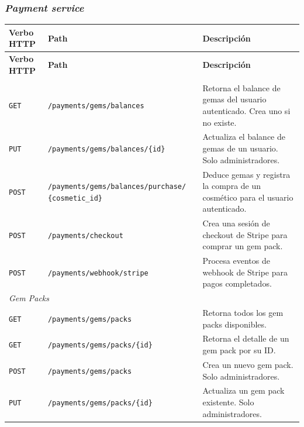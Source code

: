 \subsubsection{\textit{Payment service}}

\renewcommand{\arraystretch}{1.4}
\begin{longtable}{|p{2cm}|p{7cm}|p{5.5cm}|}
\hline
\textbf{Verbo HTTP} & \textbf{Path} & \textbf{Descripción} \\
\hline
\endfirsthead

\hline
\textbf{Verbo HTTP} & \textbf{Path} & \textbf{Descripción} \\
\hline
\endhead

\endfoot

\multicolumn{3}{|l|}{\textit{Gem Balances}} \\
\hline
\texttt{GET}    & \texttt{/payments/gems/balances}                              & Retorna el balance de gemas del usuario autenticado. Crea uno si no existe. \\
\hline
\texttt{PUT}    & \texttt{/payments/gems/balances/\{id\}}                       & Actualiza el balance de gemas de un usuario. Solo administradores. \\
\hline
\texttt{POST}   & \texttt{/payments/gems/balances/purchase/} \newline \texttt{\{cosmetic\_id\}} & Deduce gemas y registra la compra de un cosmético para el usuario autenticado. \\
\hline
\texttt{POST}   & \texttt{/payments/checkout}                                   & Crea una sesión de checkout de Stripe para comprar un gem pack. \\
\hline
\texttt{POST}   & \texttt{/payments/webhook/stripe}                             & Procesa eventos de webhook de Stripe para pagos completados. \\
\hline
\multicolumn{3}{|l|}{\textit{Gem Packs}} \\
\hline
\texttt{GET}    & \texttt{/payments/gems/packs}                                 & Retorna todos los gem packs disponibles. \\
\hline
\texttt{GET}    & \texttt{/payments/gems/packs/\{id\}}                          & Retorna el detalle de un gem pack por su ID. \\
\hline
\texttt{POST}   & \texttt{/payments/gems/packs}                                 & Crea un nuevo gem pack. Solo administradores. \\
\hline
\texttt{PUT}    & \texttt{/payments/gems/packs/\{id\}}                          & Actualiza un gem pack existente. Solo administradores. \\

\end{longtable}
